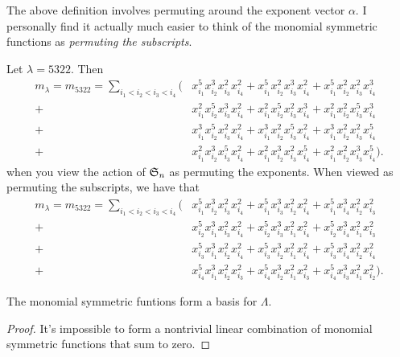 \documentclass{article}
\newcommand{\frkS}{\ensuremath\mathfrak{S}}
\begin{document}
The above definition involves permuting around the exponent vector $\alpha$. I personally find it actually much easier to think of the monomial symmetric functions as \textit{permuting the subscripts}. 

\begin{example}
    Let $\lambda = 5322$. Then
    \begin{align*}
        m_\lambda = m_{5322} = \sum_{i_1<i_2<i_3<i_4} \Big(&x_{i_1}^5x_{i_2}^3x_{i_3}^2x_{i_4}^2 + x_{i_1}^5x_{i_2}^2x_{i_3}^3x_{i_4}^2 + x_{i_1}^5x_{i_2}^2x_{i_3}^2x_{i_4}^3 \\ 
            + &x_{i_1}^2x_{i_2}^5x_{i_3}^3x_{i_4}^2 + x_{i_1}^2x_{i_2}^5x_{i_3}^2x_{i_4}^3 + x_{i_1}^2x_{i_2}^2x_{i_3}^5x_{i_4}^3  \\
            + &x_{i_1}^3x_{i_2}^5x_{i_3}^2x_{i_4}^2 + x_{i_1}^3x_{i_2}^2x_{i_3}^5x_{i_4}^2 + x_{i_1}^3x_{i_2}^2x_{i_3}^2x_{i_4}^5  \\
        + &x_{i_1}^2x_{i_2}^3x_{i_3}^5x_{i_4}^2 + x_{i_1}^2x_{i_2}^3x_{i_3}^2x_{i_4}^5 + x_{i_1}^2x_{i_2}^2x_{i_3}^3x_{i_4}^5 \Big).
    \end{align*}
    when you view the action of $\frkS_n$ as permuting the exponents. When viewed as permuting the subscripts, we have that
    \begin{align*}
        m_\lambda = m_{5322} = \sum_{i_1<i_2<i_3<i_4} \Big(
        &x_{i_1}^5x_{i_2}^3x_{i_3}^2x_{i_4}^2
        + x_{i_1}^5x_{i_3}^3x_{i_2}^2x_{i_4}^2
        + x_{i_1}^5x_{i_4}^3x_{i_2}^2x_{i_3}^2 \\
        + &x_{i_2}^5x_{i_1}^3x_{i_3}^2x_{i_4}^2
        + x_{i_2}^5x_{i_3}^3x_{i_1}^2x_{i_4}^2
        + x_{i_2}^5x_{i_4}^3x_{i_1}^2x_{i_3}^2 \\
        + &x_{i_3}^5x_{i_1}^3x_{i_2}^2x_{i_4}^2
        + x_{i_3}^5x_{i_2}^3x_{i_1}^2x_{i_4}^2
        + x_{i_3}^5x_{i_4}^3x_{i_2}^2x_{i_4}^2 \\
        + &x_{i_4}^5x_{i_1}^3x_{i_2}^2x_{i_3}^2
        + x_{i_4}^5x_{i_2}^3x_{i_1}^2x_{i_3}^2
        + x_{i_4}^5x_{i_3}^3x_{i_1}^2x_{i_2}^2
    \Big).
    \end{align*}
\end{example}

\begin{theorem}
    The monomial symmetric funtions form a basis for $\Lambda$.
\end{theorem}

\begin{proof}
    It's impossible to form a nontrivial linear combination of monomial symmetric functions that sum to zero.
\end{proof}
\end{document}
